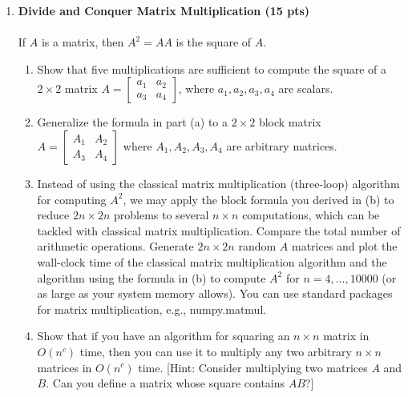 \begin{enumerate}
    
     \item \textbf{Divide and Conquer Matrix Multiplication  (15 pts)}\\\\
    If $A$ is a matrix, then $A^2=AA$ is the square of $A$.
    \begin{enumerate}
        \item  Show that five multiplications are sufficient to compute the square of a $2 \times 2$ matrix $A=\left[ \begin{array}{cc}
	    a_1 & a_2 \\ a_3 & a_4
	    \end{array} \right]$, where $a_1,a_2,a_3,a_4$ are scalars. 
        \item Generalize the formula in part (a) to a $2\times 2$ block matrix $A=\left[ \begin{array}{cc}
	    A_1 & A_2 \\ A_3 & A_4
	    \end{array} \right]$ where $A_1,A_2,A_3,A_4$ are arbitrary matrices. 
	    \item Instead of using the classical matrix multiplication (three-loop) algorithm for computing $A^2$, we may apply the block formula you derived in (b) to reduce $2n\times 2n$ problems to several $n\times n$ computations, which can be tackled with classical matrix multiplication. Compare the total number of arithmetic operations. Generate $2n\times 2n$ random $A$ matrices and plot the wall-clock time of the classical matrix multiplication algorithm and the algorithm using the formula in (b) to compute $A^2$ for $n=4,...,10000$ (or as large as your system memory allows). You can use standard packages for matrix multiplication, e.g.,  numpy.matmul.
        \item Show that if you have an algorithm for squaring an $n \times n$ matrix in $O(n^c)$ time, then you can use it to multiply any two arbitrary $n \times n$ matrices in $O(n^c)$ time. [Hint: Consider multiplying two matrices $A$ and $B$. Can you define a  matrix whose square contains $AB$?]
    \end{enumerate}

    \solution{}
    

\end{enumerate}
